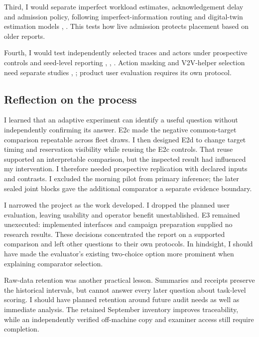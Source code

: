 \documentclass[12pt,a4paper]{article}
\begin{document}
Third, I would separate imperfect workload estimates, acknowledgement delay and admission policy, following imperfect-information routing and digital-twin estimation models \cite{ref18}, \cite{ref30}. This tests how live admission protects placement based on older reports.

Fourth, I would test independently selected traces and actors under prospective controls and seed-level reporting \cite{ref25}, \cite{ref26}, \cite{ref39}. Action masking and V2V-helper selection need separate studies \cite{ref32}, \cite{ref40}; product user evaluation requires its own protocol.

\FloatBarrier
\subsection{Reflection on the process}\label{sec:4.5}

I learned that an adaptive experiment can identify a useful question without independently confirming its answer. E2c made the negative common-target comparison repeatable across fleet draws. I then designed E2d to change target timing and reservation visibility while reusing the E2c controls. That reuse supported an interpretable comparison, but the inspected result had influenced my intervention. I therefore needed prospective replication with declared inputs and contrasts. I excluded the morning pilot from primary inference; the later sealed joint blocks gave the additional comparator a separate evidence boundary.

I narrowed the project as the work developed. I dropped the planned user evaluation, leaving usability and operator benefit unestablished. E3 remained unexecuted: implemented interfaces and campaign preparation supplied no research results. These decisions concentrated the report on a supported comparison and left other questions to their own protocols. In hindsight, I should have made the evaluator's existing two-choice option more prominent when explaining comparator selection.

Raw-data retention was another practical lesson. Summaries and receipts preserve the historical intervals, but cannot answer every later question about task-level scoring. I should have planned retention around future audit needs as well as immediate analysis. The retained September inventory improves traceability, while an independently verified off-machine copy and examiner access still require completion.
\end{document}

